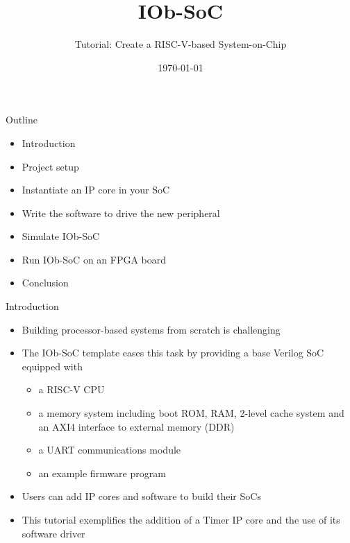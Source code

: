 \documentclass [xcolor=svgnames, t] {beamer}
\title[IOb-SoC Presentation]{IOb-SoC}
\subtitle{Tutorial: Create a RISC-V-based System-on-Chip}
\institute[IObundle Lda.]{IObundle Lda.}
\date{\today}
\begin{document}
\begin{frame}
 \titlepage
\end{frame}


\begin{frame}{Outline}
\begin{center}
   \begin{itemize}
     \item Introduction
     \item Project setup
     \item Instantiate an IP core in your SoC
     \item Write the software to drive the new peripheral
     \item Simulate IOb-SoC
     \item Run IOb-SoC on an FPGA board
     \item Conclusion
 \end{itemize}
\end{center}
\end{frame}


\begin{frame}{Introduction}
\begin{center}
    \begin{itemize}
      \item Building processor-based systems from scratch is challenging
      \item The IOb-SoC template eases this task by providing a base Verilog SoC equipped with
        \begin{itemize}
        \item a RISC-V CPU
        \item a memory system including boot ROM, RAM, 2-level cache system and an AXI4 interface to external memory (DDR)
        \item a UART communications module
        \item an example firmware program
        \end{itemize}
      \item Users can add IP cores and software to build their SoCs
      \item This tutorial exemplifies the addition of a Timer IP core and the use of its software driver
    \end{itemize}
\end{center}
\end{frame}
\end{document}
